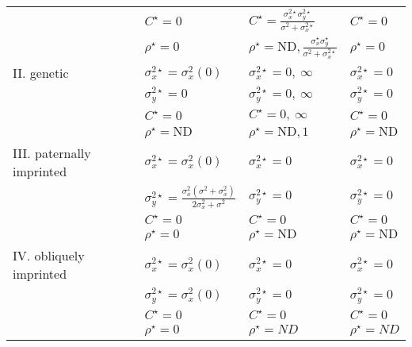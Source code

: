 \documentclass{article}
\begin{document}
\begin{landscape}
\begin{table}
\begin{tabular}{|l|l|l|l|}
\\ & $ C^\star=0$ &   $ C^\star=\frac{\sigma_x^{2\star}\sigma_y^{2\star}}{\sigma^2+\sigma_x^{2\star}}$  & $ C^\star=0$
\\ & $\rho^\star=0$ & $\rho^\star=\text{ND},\frac{\sigma_x^{\star}\sigma_y^{\star}}{\sigma^2+\sigma_x^{2\star}}$ & $\rho^\star=0$ 
\\\hline II. genetic &  $\sigma_x^{2\star}=\sigma_x^2(0)$  & $\sigma_x^{2\star}=0,\ \infty$  & $\sigma_x^{2\star}=0$                      
\\  		&  $\sigma_y^{2\star}=0$	& $\sigma_y^{2\star}= 0 , \ \infty$ 	  & $\sigma_y^{2\star}=0$  
\\ & $ C^\star=0$   & $ C^\star=0, \ \infty$        & $ C^\star=0$ 
\\ & $\rho^\star=\text{ND}$ & $\rho^\star=\text{ND},1$ & $\rho^\star=\text{ND}$         
\\\hline III. paternally imprinted & $\sigma_x^{2\star}=\sigma_x^2(0)$ & $\sigma_x^{2\star}=0$  & $\sigma_x^{2\star}=0$                       
\\  			& $\sigma_y^{2\star}=\frac{\sigma_x^2(\sigma^2+\sigma_x^2)}{2\sigma_x^2+\sigma^2}$	  & $\sigma_y^{2\star}=0$  & $\sigma_y^{2\star}=0$                       
\\ & $ C^\star=0$ & $ C^\star=0$ & $ C^\star=0$
\\ & $\rho^\star=0$ & $\rho^\star=\text{ND}$ & $\rho^\star=\text{ND}$
\\ \hline IV. obliquely imprinted & $\sigma_x^{2\star}=\sigma_x^2(0)$ & $\sigma_x^{2\star}=0$ & $\sigma_x^{2\star}=0$
\\ & $\sigma_y^{2\star}=\sigma_x^2(0)$ & $\sigma_y^{2\star}=0$ & $\sigma_y^{2\star}=0$
\\ & $C^\star=0$ & $C^\star=0$ & $C^\star=0$
\\ & $\rho^\star=0$ & $\rho^\star=ND$ & $\rho^\star=ND$
\\\hline
\end{tabular}
\end{table}
\end{landscape}
\end{document}

